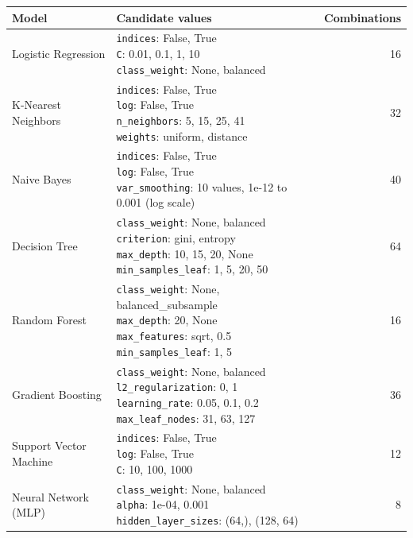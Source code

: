 \begin{tabular}{llr}
\toprule
Model & Candidate values & Combinations \\
\midrule
Logistic Regression & \makecell[l]{\texttt{indices}: False, True \\ \texttt{C}: 0.01, 0.1, 1, 10 \\ \texttt{class\_weight}: None, balanced} & 16 \\ \addlinespace
K-Nearest Neighbors & \makecell[l]{\texttt{indices}: False, True \\ \texttt{log}: False, True \\ \texttt{n\_neighbors}: 5, 15, 25, 41 \\ \texttt{weights}: uniform, distance} & 32 \\ \addlinespace
Naive Bayes & \makecell[l]{\texttt{indices}: False, True \\ \texttt{log}: False, True \\ \texttt{var\_smoothing}: 10 values, 1e-12 to 0.001 (log scale)} & 40 \\ \addlinespace
Decision Tree & \makecell[l]{\texttt{class\_weight}: None, balanced \\ \texttt{criterion}: gini, entropy \\ \texttt{max\_depth}: 10, 15, 20, None \\ \texttt{min\_samples\_leaf}: 1, 5, 20, 50} & 64 \\ \addlinespace
Random Forest & \makecell[l]{\texttt{class\_weight}: None, balanced\_subsample \\ \texttt{max\_depth}: 20, None \\ \texttt{max\_features}: sqrt, 0.5 \\ \texttt{min\_samples\_leaf}: 1, 5} & 16 \\ \addlinespace
Gradient Boosting & \makecell[l]{\texttt{class\_weight}: None, balanced \\ \texttt{l2\_regularization}: 0, 1 \\ \texttt{learning\_rate}: 0.05, 0.1, 0.2 \\ \texttt{max\_leaf\_nodes}: 31, 63, 127} & 36 \\ \addlinespace
Support Vector Machine & \makecell[l]{\texttt{indices}: False, True \\ \texttt{log}: False, True \\ \texttt{C}: 10, 100, 1000} & 12 \\ \addlinespace
Neural Network (MLP) & \makecell[l]{\texttt{class\_weight}: None, balanced \\ \texttt{alpha}: 1e-04, 0.001 \\ \texttt{hidden\_layer\_sizes}: (64,), (128, 64)} & 8 \\
\bottomrule
\end{tabular}
